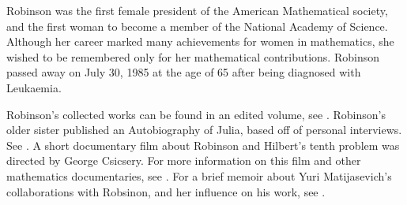 \documentclass[../../../include/open-logic-section]{subfiles}
\begin{document}
Robinson was the first female president of the American Mathematical
society, and the first woman to become a member of the National Academy of
Science. Although her career marked many achievements for women in
mathematics, she wished to be remembered only for her mathematical
contributions. Robinson passed away on July 30, 1985 at the age of 65 after
being diagnosed with Leukaemia.


\begin{reading} Robinson's collected works can be found in an edited
volume, see \citet{Robinson1996}. Robinson's older sister published an
Autobiography of Julia, based off of personal interviews. See
\citet{Reid1986}. A short documentary film about Robinson and Hilbert's
tenth problem was directed by George Csicsery. For more information on this
film and other mathematics documentaries, see \citet{Csicsery2016}. For a
brief memoir about Yuri Matijasevich's collaborations with Robsinon, and
her influence on his work, see \citet{Matijasevich1992}. \end{reading}
\end{document}
